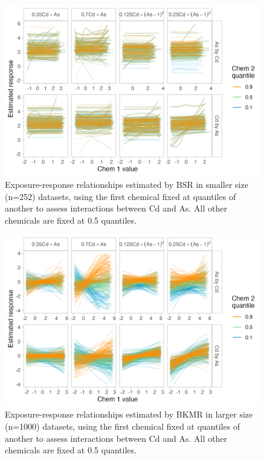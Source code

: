 \documentclass[12pt, twoside]{amherstthesis}
\begin{document}
\begin{figure}

{\centering \includegraphics[width=0.8\linewidth]{figures/ch4_ssm_biv_expresp_2} 

}

\caption{Exposure-response relationships estimated by BSR in smaller size (n=252) datasets, using the first chemical fixed at quantiles of another to assess interactions between Cd and As. All other chemicals are fixed at 0.5 quantiles.}\label{fig:ssmcdas}
\end{figure}
\begin{figure}

{\centering \includegraphics[width=0.8\linewidth]{figures/ch4_klg_biv_expresp_2} 

}

\caption{Exposure-response relationships estimated by BKMR in larger size (n=1000) datasets, using the first chemical fixed at quantiles of another to assess interactions between Cd and As. All other chemicals are fixed at 0.5 quantiles.}\label{fig:klgcdas}
\end{figure}
\end{document}
